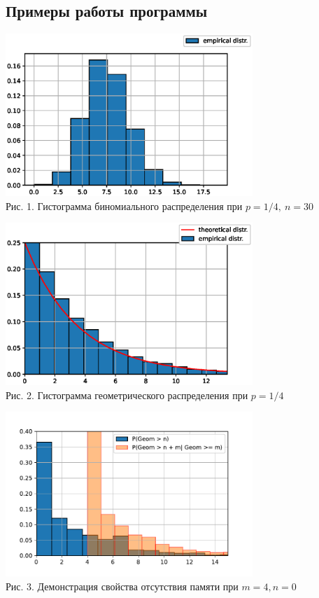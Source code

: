 \documentclass[11pt]{article}
\begin{document}
	\subsection{Примеры работы программы}
	\begin{center}
		\includegraphics[width=0.7\textwidth]{1_1.eps}\\
		{Рис. 1. Гистограмма биномиального распределения при $p = 1/4, \ n = 30$ }
	\end{center}
	\begin{center}
		\includegraphics[width=0.7\textwidth]{1_2.eps}\\
		{Рис. 2. Гистограмма геометрического распределения при $p = 1/4$}
	\end{center}
	\begin{center}
		\includegraphics[width=0.7\textwidth]{1_3.pdf}\\
		{Рис. 3. Демонстрация свойства отсутствия памяти при $m = 4, n = 0$}
	\end{center}
\end{document}
